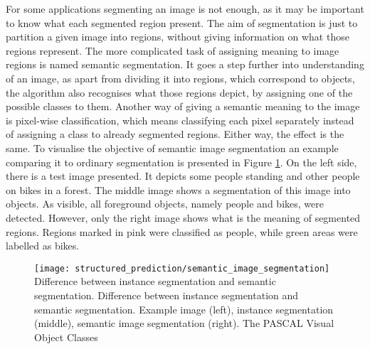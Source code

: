 For some applications segmenting an image is not enough, as it may be important to know what each segmented region present. The aim of segmentation is just to partition a given image into regions, without giving information on what those regions represent. The more complicated task of assigning meaning to image regions is named semantic segmentation. It goes a step further into understanding of an image, as apart from dividing it into regions, which correspond to objects, the algorithm also recognises what those regions depict, by assigning one of the possible classes to them. Another way of giving a semantic meaning to the image is pixel-wise classification, which means classifying each pixel separately instead of assigning a class to already segmented regions. Either way, the effect is the same. To visualise the objective of semantic image segmentation an example comparing it to ordinary segmentation is presented in Figure  \ref{fig:semantic_image_segmentation}. 
On the left side, there is a test image presented. It depicts some people standing and other people on bikes in a forest. The middle image shows a segmentation of this image into objects. As visible, all foreground objects, namely people and bikes, were detected. However, only the right image shows what is the meaning of segmented regions. Regions marked in pink were classified as people, while green areas were labelled as bikes. 
\begin{figure}[h]
    \texttt{[image: structured\_prediction/semantic\_image\_segmentation]}
    \captionsource
    {Difference between instance segmentation and semantic segmentation.}
    {Difference between instance segmentation and semantic segmentation. Example image (left), instance segmentation (middle), semantic image segmentation (right).}
    {The PASCAL Visual Object Classes \cite{voc}}
     \label{fig:semantic_image_segmentation}
\end{figure}

